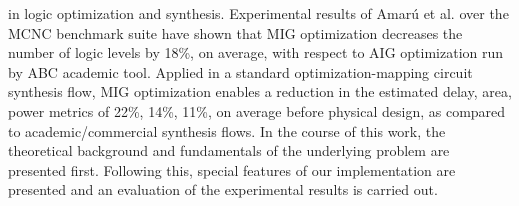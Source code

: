 \documentclass[
	accentcolor=1c,%
	type=intern,
	marginpar=false,
	ruledheaders=section,
	class=report,
	BCOR=5mm,
      parskip=half-,
	fontsize=10pt
	]{tudapub}
\begin{document}
{in logic optimization and synthesis.
\newline
\newline
Experimental results of Amarú et al. over the MCNC benchmark suite have shown that MIG optimization decreases the
number of logic levels by 18\%, on average, with respect to AIG optimization run by ABC academic
tool. Applied in a standard optimization-mapping circuit synthesis flow, MIG optimization enables
a reduction in the estimated {delay, area, power} metrics of {22\%, 14\%, 11\%},  on average before physical
design, as compared to academic/commercial synthesis flows.
\newline
\newline
In the course of this work, the theoretical background and fundamentals of the underlying problem are presented first.
Following this, special features of our implementation are presented and an evaluation of the experimental results is carried out.
}

\newpage
\end{document}
